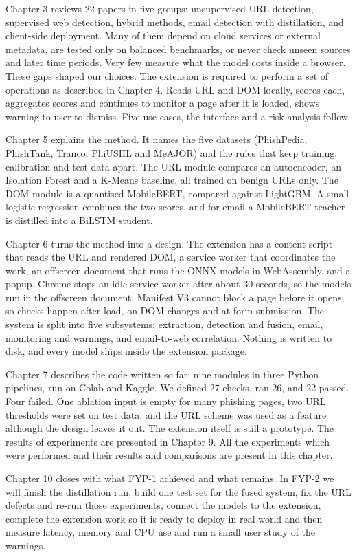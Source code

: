 \documentclass{FastFyp}
\begin{document}
Chapter 3 reviews 22 papers in five groups: unsupervised URL detection, supervised web detection, hybrid methods, email detection with distillation, and client-side deployment. Many of them depend on cloud services or external metadata, are tested only on balanced benchmarks, or never check unseen sources and later time periods. Very few measure what the model costs inside a browser. These gaps shaped our choices. The extension is required to perform a set of operations as described in Chapter 4. Reads URL and DOM locally, scores each, aggregates scores and continues to monitor a page after it is loaded, shows warning to user to dismiss. Five use cases, the interface and a risk analysis follow.

Chapter 5 explains the method. It names the five datasets (PhishPedia, PhishTank, Tranco, PhiUSIIL and MeAJOR) and the rules that keep training, calibration and test data apart. The URL module compares an autoencoder, an Isolation Forest and a K-Means baseline, all trained on benign URLs only. The DOM module is a quantised MobileBERT, compared against LightGBM. A small logistic regression combines the two scores, and for email a MobileBERT teacher is distilled into a BiLSTM student.

Chapter 6 turns the method into a design. The extension has a content script that reads the URL and rendered DOM, a service worker that coordinates the work, an offscreen document that runs the ONNX models in WebAssembly, and a popup. Chrome stops an idle service worker after about 30 seconds, so the models run in the offscreen document. Manifest V3 cannot block a page before it opens, so checks happen after load, on DOM changes and at form submission. The system is split into five subsystems: extraction, detection and fusion, email, monitoring and warnings, and email-to-web correlation. Nothing is written to disk, and every model ships inside the extension package.

Chapter 7 describes the code written so far: nine modules in three Python pipelines, run on Colab and Kaggle. We defined 27 checks, ran 26, and 22 passed. Four failed. One ablation input is empty for many phishing pages, two URL thresholds were set on test data, and the URL scheme was used as a feature although the design leaves it out. The extension itself is still a prototype. The results of experiments are presented in Chapter 9. All the experiments which were performed and their results and comparisons are present in this chapter. 

Chapter 10 closes with what FYP-1 achieved and what remains. In FYP-2 we will finish the distillation run, build one test set for the fused system, fix the URL defects and re-run those experiments, connect the models to the extension, complete the extension work so it is ready to deploy in real world and then measure latency, memory and CPU use and run a small user study of the warnings.
\end{document}
